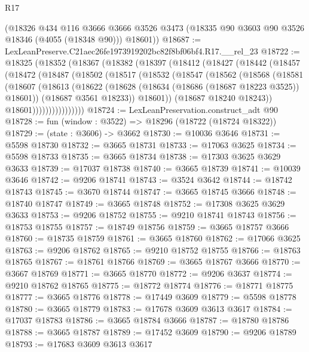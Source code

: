 \begin{lexlean}{R17}
\begin{coremodule}
      (@18326
        @434
        @116
        @3666
        @3666
        @3526
        @3473
        (@18335 @90 @3603 @90 @3526 @18346 (@4055 (@18348 @90)))
        @18601))
@18687 := LexLeanPreserve.C21aec26fe1973919202bc82f8bf06bf4.R17.__rel_23
@18722 := @18325
    (@18352
      (@18367
        (@18382
          (@18397
            (@18412
              (@18427
                (@18442
                  (@18457
                    (@18472
                      (@18487
                        (@18502
                          (@18517
                            (@18532
                              (@18547
                                (@18562
                                  (@18568
                                    (@18581
                                      (@18607
                                        (@18613
                                          (@18622
                                            (@18628 (@18634 (@18686 (@18687 @18223 @3525)) @18601))
                                            (@18687 @3561 @18233))
                                          @18601))
                                      (@18687 @18240 @18243))
                                    @18601))))))))))))))))
@18724 := LexLeanPreservation.construct_adt @90
@18728 := fun (window : @3522) => @18296 (@18722 (@18724 @18322))
@18729 := (state : @3606) -> @3662
@18730 := @10036 @3646
@18731 := @5598 @18730
@18732 := @3665 @18731
@18733 := @17063 @3625
@18734 := @5598 @18733
@18735 := @3665 @18734
@18738 := @17303 @3625 @3629 @3633
@18739 := @17037 @18738
@18740 := @3665 @18739
@18741 := @10039 @3646
@18742 := @9206 @18741
@18743 := @3524 @3642
@18744 := @18742 @18743
@18745 := @3670 @18744
@18747 := @3665 @18745 @3666
@18748 := @18740 @18747
@18749 := @3665 @18748
@18752 := @17308 @3625 @3629 @3633
@18753 := @9206 @18752
@18755 := @9210 @18741 @18743
@18756 := @18753 @18755
@18757 := @18749 @18756
@18759 := @3665 @18757 @3666
@18760 := @18735 @18759
@18761 := @3665 @18760
@18762 := @17066 @3625
@18763 := @9206 @18762
@18765 := @9210 @18752 @18755
@18766 := @18763 @18765
@18767 := @18761 @18766
@18769 := @3665 @18767 @3666
@18770 := @3667 @18769
@18771 := @3665 @18770
@18772 := @9206 @3637
@18774 := @9210 @18762 @18765
@18775 := @18772 @18774
@18776 := @18771 @18775
@18777 := @3665 @18776
@18778 := @17449 @3609
@18779 := @5598 @18778
@18780 := @3665 @18779
@18783 := @17678 @3609 @3613 @3617
@18784 := @17037 @18783
@18786 := @3665 @18784 @3666
@18787 := @18780 @18786
@18788 := @3665 @18787
@18789 := @17452 @3609
@18790 := @9206 @18789
@18793 := @17683 @3609 @3613 @3617

\end{coremodule}
\end{lexlean}
